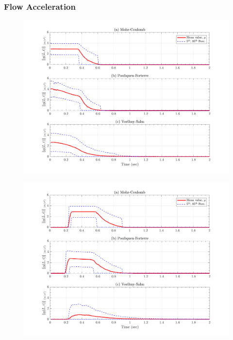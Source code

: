 \documentclass{article}
\begin{document}
\subsubsection{Flow Acceleration}
\begin{figure}[H]
	\begin{minipage}[b]{0.5\linewidth}
    	\centering
    	\includegraphics[width=1\textwidth]{InclinedPlane/Acceleration/accel_L1R.png}
    	\label{fig:Ramp-L1-AccR}
	\end{minipage}
	\begin{minipage}[b]{0.5\linewidth}
		\centering
		\includegraphics[width=1\textwidth]{InclinedPlane/Acceleration/accel_L2R.png}
    	\label{fig:Ramp-L2-AccR}
    \end{minipage}


\end{figure}
\end{document}
